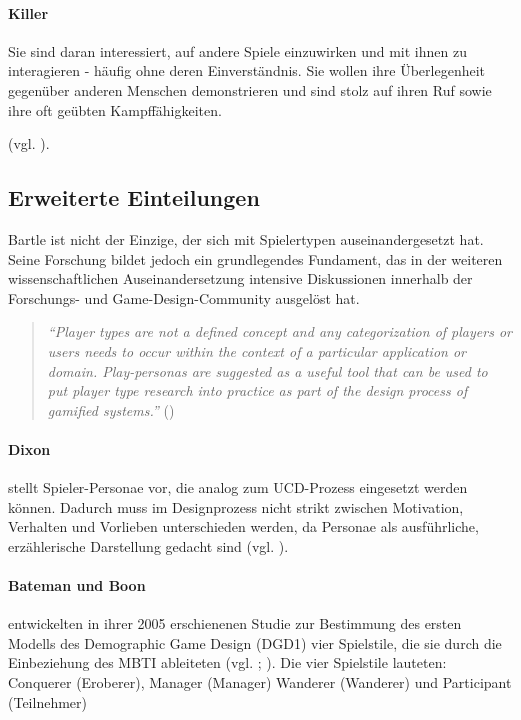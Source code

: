 \paragraph{Killer}
Sie sind daran interessiert, auf andere Spiele einzuwirken und mit ihnen zu interagieren - häufig ohne deren Einverständnis. Sie wollen ihre Überlegenheit gegenüber anderen Menschen demonstrieren und sind stolz auf ihren Ruf sowie ihre oft geübten Kampffähigkeiten.

(vgl. \cite{bartle_hearts_1996}).

\subsection{Erweiterte Einteilungen}
Bartle ist nicht der Einzige, der sich mit Spielertypen auseinandergesetzt hat. Seine Forschung bildet jedoch ein grundlegendes Fundament, das in der weiteren wissenschaftlichen Auseinandersetzung intensive Diskussionen innerhalb der Forschungs- und Game-Design-Community ausgelöst hat. 
\begin{quote}
    \textit{
        \enquote{Player types are not a defined concept and any categorization of players or users needs to occur within the context of a particular application or domain. Play-personas are suggested as a useful tool that can be used to put player type research into practice as part of the design process of gamified systems.}
    } 
    (\cite{dixon_player_nodate})
\end{quote}

\paragraph{Dixon} 
stellt Spieler-Personae vor, die analog zum \ac{UCD}-Prozess eingesetzt werden können. Dadurch muss im Designprozess nicht strikt zwischen Motivation, Verhalten und Vorlieben unterschieden werden, da Personae als ausführliche, erzählerische Darstellung gedacht sind (vgl. \cite{dixon_player_nodate}).

\paragraph{Bateman und Boon}
entwickelten in ihrer 2005 erschienenen Studie zur Bestimmung des ersten Modells des Demographic Game Design (DGD1) vier Spielstile, die sie durch die Einbeziehung des \ac{MBTI} ableiteten (vgl. \cite{noauthor_mbti_nodate}; \cite{bateman_21st_2005}).
Die vier Spielstile lauteten: Conquerer (Eroberer), Manager (Manager) Wanderer (Wanderer) und Participant (Teilnehmer)

